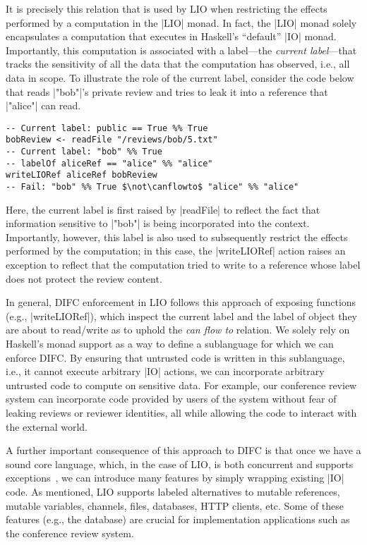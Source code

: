 It is precisely this relation that is used by LIO when restricting the
effects performed by a computation in the \hs|LIO| monad.
%
In fact, the \hs|LIO| monad solely encapsulates a computation that
executes in Haskell's ``default'' \hs|IO| monad.
%
Importantly, this computation is associated with a label---the
\emph{current label}---that tracks the sensitivity of all the data
that the computation has observed, i.e., all data in scope.
%
To illustrate the role of the current label, consider the code below
that reads \hs|"bob"|'s private review and tries to leak it into a
reference that \hs|"alice"| can read.
\begin{verbatim}
-- Current label: public == True %% True
bobReview <- readFile "/reviews/bob/5.txt"
-- Current label: "bob" %% True
-- labelOf aliceRef == "alice" %% "alice"
writeLIORef aliceRef bobReview
-- Fail: "bob" %% True $\not\canflowto$ "alice" %% "alice"
\end{verbatim}
%
Here, the current label is first raised by \hs|readFile| to reflect
the fact that information sensitive to \hs|"bob"| is being
incorporated into the context.
%
Importantly, however, this label is also used to subsequently restrict
the effects performed by the computation; in this case, the
\hs|writeLIORef| action raises an exception to reflect that
the computation tried to write to a reference whose label
does not protect the review content.

In general, DIFC enforcement in LIO follows this approach of exposing
functions (e.g., \hs|writeLIORef|), which inspect the current label
and the label of object they are about to read/write as to uphold the
\emph{can flow to} relation.
%
We solely rely on Haskell's monad support as a way to define a
sublanguage for which we can enforce DIFC.
%
By ensuring that untrusted code is written in this sublanguage, i.e.,
it cannot execute arbitrary \hs|IO| actions, we can incorporate
arbitrary untrusted code to compute on sensitive data.
%
For example, our conference review system can incorporate code
provided by users of the system without fear of leaking reviews or
reviewer identities, all while allowing the code to interact with the
external world.

A further important consequence of this approach to DIFC is that once
we have a sound core language, which, in the case of LIO, is both
concurrent and supports exceptions~\cite{Breeze, stefan:2012:arxiv-flexible},
%  
we can introduce many features by simply wrapping existing \hs|IO|
code.
%
As mentioned, LIO supports labeled alternatives to mutable references,
mutable variables, channels, files, databases, HTTP clients, etc.
%
Some of these features (e.g., the database) are crucial for
implementation applications such as the conference review system.

